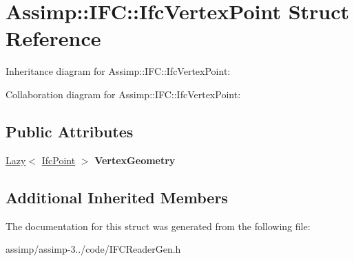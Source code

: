\hypertarget{struct_assimp_1_1_i_f_c_1_1_ifc_vertex_point}{\section{Assimp\+:\+:I\+F\+C\+:\+:Ifc\+Vertex\+Point Struct Reference}
\label{struct_assimp_1_1_i_f_c_1_1_ifc_vertex_point}
}


Inheritance diagram for Assimp\+:\+:I\+F\+C\+:\+:Ifc\+Vertex\+Point\+:


Collaboration diagram for Assimp\+:\+:I\+F\+C\+:\+:Ifc\+Vertex\+Point\+:
\subsection*{Public Attributes}
\begin{DoxyCompactItemize}
\item 
\hypertarget{struct_assimp_1_1_i_f_c_1_1_ifc_vertex_point_af55a44eaeee8ee97bde070e19a58967e}{\hyperlink{struct_assimp_1_1_s_t_e_p_1_1_lazy}{Lazy}$<$ \hyperlink{struct_assimp_1_1_i_f_c_1_1_ifc_point}{Ifc\+Point} $>$ {\bfseries Vertex\+Geometry}}\label{struct_assimp_1_1_i_f_c_1_1_ifc_vertex_point_af55a44eaeee8ee97bde070e19a58967e}

\end{DoxyCompactItemize}
\subsection*{Additional Inherited Members}


The documentation for this struct was generated from the following file\+:\begin{DoxyCompactItemize}
\item 
assimp/assimp-\/3../code/I\+F\+C\+Reader\+Gen.\+h\end{DoxyCompactItemize}
